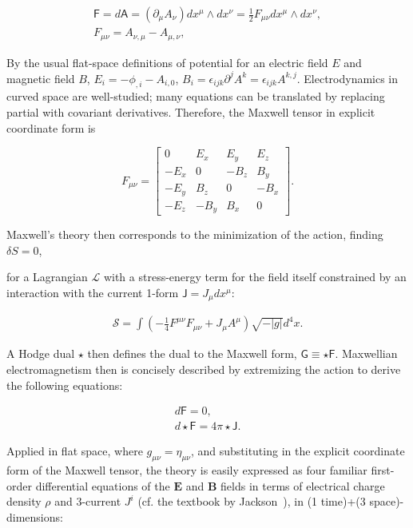 \begin{eqnarray}
\textsf{F} = d \textsf{A} = (\partial_\mu A_\nu) dx^\mu \wedge dx^\nu = \frac{1}{2} F_{\mu\nu} dx^\mu \wedge dx^\nu, \\
F_{\mu \nu} = A_{\nu,\mu} - A_{\mu,\nu},
\end{eqnarray}

By the usual flat-space definitions of potential for an electric field $E$ and magnetic field $B$, $E_i = -\phi_{,i} - A_{i,0}$, $B_i = \epsilon_{ijk} \partial^j A^k = \epsilon_{ijk} A^{k, j}$. 
Electrodynamics in curved space are well-studied; many equations can be translated by replacing partial with covariant derivatives.
Therefore, the Maxwell tensor in explicit coordinate form is

\begin{equation}
F_{\mu\nu} =
\left[
\begin{array}{cccc}
0 & E_x & E_y & E_z\\
-E_x & 0 & -B_z & B_y \\
-E_y & B_z & 0 & -B_x\\
-E_z & -B_y & B_x & 0
\end{array} \right].
\end{equation}

\noindent Maxwell's theory then corresponds to the minimization of the action, finding $\delta S = 0$,


\noindent for a Lagrangian $\mathcal{L}$ with a stress-energy term for the field itself constrained by an interaction with the current 1-form $\textsf{J} = J_\mu d x^\mu$:

\begin{eqnarray}
\mathcal{S} = \int \left( -\frac{1}{4} F^{\mu \nu} F_{\mu \nu} + J_\mu A^\mu \right) \sqrt{-|g|}d^4 x.
\end{eqnarray}

A Hodge dual $\star$ then defines the dual to the Maxwell form, $\textsf{G} \equiv \star \textsf{F}$. 
Maxwellian electromagnetism then is concisely described by extremizing the action to derive the following equations:

\begin{eqnarray}
d \textsf{F} = 0,\\
d \star \textsf{F} = 4 \pi \star \textsf{J}.
\end{eqnarray}  

Applied in flat space, where $g_{\mu \nu} = \eta_{\mu \nu}$, and substituting in the explicit coordinate form of the Maxwell tensor, the theory is easily expressed as four familiar first-order differential equations of the $\textbf{E}$ and $\textbf{B}$ fields in terms of electrical charge density $\rho$ and 3-current $J^i$ (cf. the textbook by Jackson~\cite{JacksonEM}), in (1 time)+(3 space)-dimensions:
 
